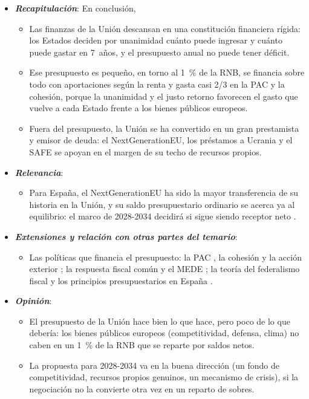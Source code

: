 \documentclass[11pt]{article}
\begin{document}
\begin{itemize}
\item \textbf{\emph{Recapitulación}}: En conclusión,
  \begin{itemize}
  \item Las finanzas de la Unión descansan en una constitución financiera rígida: los Estados deciden por unanimidad cuánto puede ingresar y cuánto puede gastar en 7~años, y el presupuesto anual no puede tener déficit.
  \item Ese presupuesto es pequeño, en torno al 1~\% de la RNB, se financia sobre todo con aportaciones según la renta y gasta casi 2/3 en la PAC y la cohesión, porque la unanimidad y el justo retorno favorecen el gasto que vuelve a cada Estado frente a los bienes públicos europeos.
  \item Fuera del presupuesto, la Unión se ha convertido en un gran prestamista y emisor de deuda: el NextGenerationEU, los préstamos a Ucrania y el SAFE se apoyan en el margen de su techo de recursos propios.
  \end{itemize}
\item \textbf{\emph{Relevancia}}:
  \begin{itemize}
  \item Para España, el NextGenerationEU ha sido la mayor transferencia de su historia en la Unión, y su saldo presupuestario ordinario se acerca ya al equilibrio: el marco de 2028-2034 decidirá si sigue siendo receptor neto .
  \end{itemize}
\item \textbf{\emph{Extensiones y relación con otras partes del temario}}:
  \begin{itemize}
  \item Las políticas que financia el presupuesto: la PAC , la cohesión  y la acción exterior ; la respuesta fiscal común y el MEDE ; la teoría del federalismo fiscal  y los principios presupuestarios en España .
  \end{itemize}
\item \textbf{\emph{Opinión}}:
  \begin{itemize}
  \item El presupuesto de la Unión hace bien lo que hace, pero poco de lo que debería: los bienes públicos europeos (competitividad, defensa, clima) no caben en un 1~\% de la RNB que se reparte por saldos netos.

  \item La propuesta para 2028-2034 va en la buena dirección (un fondo de competitividad, recursos propios genuinos, un mecanismo de crisis), si la negociación no la convierte otra vez en un reparto de sobres.


\end{itemize}
\end{itemize}
\end{document}
